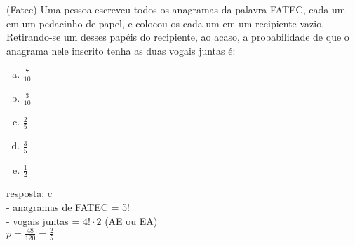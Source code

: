\begin{ex}
 (Fatec) Uma pessoa escreveu todos os anagramas da palavra FATEC, cada um em um pedacinho de papel, e colocou-os cada um em um recipiente vazio. Retirando-se um desses papéis do recipiente, ao acaso, a probabilidade de que o anagrama nele inscrito tenha as duas vogais juntas é:
    \begin{enumerate}[(a)]
    \item $\frac{7}{10}$
    \item $\frac{3}{10}$
    \item $\frac{2}{5}$
    \item $\frac{3}{5}$
    \item $\frac{1}{2}$
    \end{enumerate}
      \begin{sol}
      resposta: c  \\
         - anagramas de FATEC = 5! \\
         - vogais juntas =  $4!\cdot2$ (AE ou EA)\\
         $p=\frac{48}{120}=\frac{2}{5}$
      \end{sol}
\end{ex}